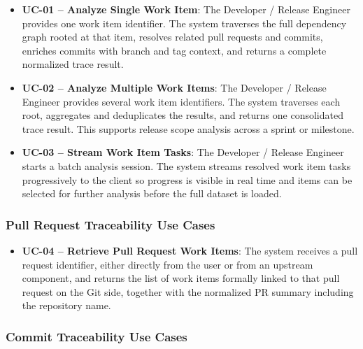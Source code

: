 \begin{itemize}
  \item \textbf{UC-01 -- Analyze Single Work Item}: The Developer / Release Engineer provides one work item identifier. The system traverses the full dependency graph rooted at that item, resolves related pull requests and commits, enriches commits with branch and tag context, and returns a complete normalized trace result.

  \item \textbf{UC-02 -- Analyze Multiple Work Items}: The Developer / Release Engineer provides several work item identifiers. The system traverses each root, aggregates and deduplicates the results, and returns one consolidated trace result. This supports release scope analysis across a sprint or milestone.

  \item \textbf{UC-03 -- Stream Work Item Tasks}: The Developer / Release Engineer starts a batch analysis session. The system streams resolved work item tasks progressively to the client so progress is visible in real time and items can be selected for further analysis before the full dataset is loaded.
\end{itemize}

\subsubsection{Pull Request Traceability Use Cases}

\begin{itemize}
  \item \textbf{UC-04 -- Retrieve Pull Request Work Items}: The system receives a pull request identifier, either directly from the user or from an upstream component, and returns the list of work items formally linked to that pull request on the Git side, together with the normalized PR summary including the repository name.
\end{itemize}

\subsubsection{Commit Traceability Use Cases}

